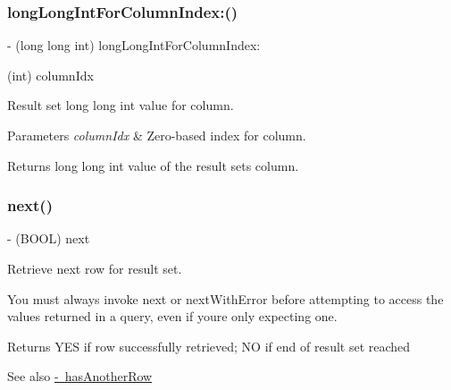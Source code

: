 \subsubsection{\texorpdfstring{long\+Long\+Int\+For\+Column\+Index\+:()}{longLongIntForColumnIndex:()}}
{\footnotesize\ttfamily -\/ (long long int) long\+Long\+Int\+For\+Column\+Index\+: \begin{DoxyParamCaption}\item[{(int)}]{column\+Idx }\end{DoxyParamCaption}}

Result set {\ttfamily long long int} value for column.


\begin{DoxyParams}{Parameters}
{\em column\+Idx} & Zero-\/based index for column.\\
\hline
\end{DoxyParams}
\begin{DoxyReturn}{Returns}
{\ttfamily long long int} value of the result set\textquotesingle{}s column. 
\end{DoxyReturn}
\mbox{\label{interface_o_p_t_l_y_f_m_d_b_result_set_aed75988ef0079729eca9fcfdef92ec07}} 
\subsubsection{\texorpdfstring{next()}{next()}}
{\footnotesize\ttfamily -\/ (B\+O\+OL) next \begin{DoxyParamCaption}{ }\end{DoxyParamCaption}}

Retrieve next row for result set.

You must always invoke {\ttfamily next} or {\ttfamily next\+With\+Error} before attempting to access the values returned in a query, even if you\textquotesingle{}re only expecting one.

\begin{DoxyReturn}{Returns}
{\ttfamily Y\+ES} if row successfully retrieved; {\ttfamily NO} if end of result set reached
\end{DoxyReturn}
\begin{DoxySeeAlso}{See also}
\mbox{\hyperlink{interface_o_p_t_l_y_f_m_d_b_result_set_aba289dd61c9163a368b2898ab3aea0ae}{-\/ has\+Another\+Row}} 
\end{DoxySeeAlso}
\mbox{\label{interface_o_p_t_l_y_f_m_d_b_result_set_adf8089c880322493cc638aaa8f6ebb9b}} 

